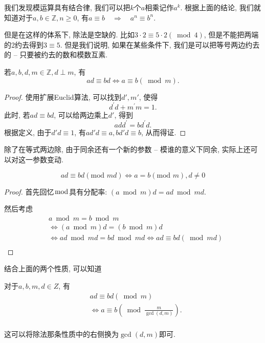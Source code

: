 \documentclass{ctexart}
\begin{document}
我们发现模运算具有结合律, 我们可以把$k$个$a$相乘记作$a^k$. 根据上面的结论, 我们就知道对于$a, b \in \mathbb{Z}, n \geqslant 0$, 有$a \equiv b \quad \Rightarrow \quad a^n \equiv b^n$. 

但是在这样的体系下, 除法是空缺的. 比如$3 \cdot 2 \equiv 5 \cdot 2(\bmod 4)$, 但是不能把两端的2约去得到$3  \equiv 5$. 但是我们说明, 如果在某些条件下, 我们是可以把等号两边约去的 -- 只要被约去的数和模数互素. 

\begin{prop}
    若$a, b, d, m \in \mathbb{Z}, d \perp m$, 有$$a d \equiv b d \Leftrightarrow a \equiv b(\bmod m).$$
    
\end{prop}

\begin{proof}
    使用扩展Euclid算法, 可以找到$d', m'$, 使得
$$d^{\prime} d+m^{\prime} m=1.$$
此时, 若$a d \equiv b d$, 可以给两边乘上$d'$, 得到$$a d d^{\prime}=b d^{\prime} d.$$ 根据定义, 由于$d'd\equiv 1$, 有$ad'd\equiv a, bd'd\equiv b$, 从而得证.
\end{proof}

除了在等式两边除, 由于同余还有一个新的参数 -- 模谁的意义下同余, 实际上还可以对这一参数变动.

\begin{prop}
    $$
a d \equiv b d(\text {mod } m d) \Leftrightarrow a=b(\text {mod } m), d \neq 0
$$
    
\end{prop}

\begin{proof}
    首先回忆$\bmod$具有分配率: $(a \bmod m)d=ad \bmod md$. 

    然后考虑
    $$
    \begin{aligned}
& a \bmod m=b \bmod m \\
& \Leftrightarrow(a \bmod m) d=(b \bmod m) d \\
& \Leftrightarrow ad \bmod md = bd \bmod md \Leftrightarrow ad \equiv bd (\bmod md) \\
&
\end{aligned}
$$
\end{proof}

结合上面的两个性质, 可以知道
\begin{corollary}
    对于$a, b, m, d \in Z$, 有
    $$
\begin{aligned}
& a d \equiv b d(\bmod m) \\
& \Leftrightarrow a\equiv b\left(\bmod \frac{m}{\operatorname{gcd}(d, m)}\right) . \\
&
\end{aligned}
$$

\end{corollary}
这可以将除法那条性质中的右侧换为$\gcd(d,m)$即可. 
\end{document}
